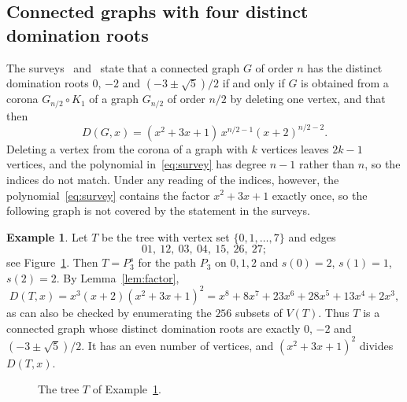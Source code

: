 \documentclass{amsart}
\theoremstyle{definition}
\newtheorem{example}[theorem]{Example}
\theoremstyle{remark}
\numberwithin{equation}{section}
\begin{document}
\subsection{Connected graphs with four distinct domination roots}

The surveys~\cite[Theorem~10]{Ali11s} and~\cite[Theorem~12, Eq.~(4)]{Ali13} state that a connected graph $G$ of order $n$ has the distinct domination roots $0$, $-2$ and $(-3\pm\sqrt5)/2$ if and only if $G$ is obtained from a corona $G_{n/2}\circ K_1$ of a graph $G_{n/2}$ of order $n/2$ by deleting one vertex, and that then
\begin{equation}\label{eq:survey}
D(G,x)=(x^2+3x+1)\,x^{n/2-1}(x+2)^{n/2-2}.
\end{equation}
Deleting a vertex from the corona of a graph with $k$ vertices leaves $2k-1$ vertices, and the polynomial in~\eqref{eq:survey} has degree $n-1$ rather than $n$, so the indices do not match. Under any reading of the indices, however, the polynomial~\eqref{eq:survey} contains the factor $x^2+3x+1$ exactly once, so the following graph is not covered by the statement in the surveys.

\begin{example}\label{ex:tree}
Let $T$ be the tree with vertex set $\{0,1,\dots,7\}$ and edges
\[
01,\ 12,\ 03,\ 04,\ 15,\ 26,\ 27;
\]
see Figure~\ref{fig:tree}. Then $T=P_3^s$ for the path $P_3$ on $0,1,2$ and $s(0)=2$, $s(1)=1$, $s(2)=2$. By Lemma~\ref{lem:factor},
\[
D(T,x)=x^3(x+2)(x^2+3x+1)^2=x^8+8x^7+23x^6+28x^5+13x^4+2x^3,
\]
as can also be checked by enumerating the $256$ subsets of $V(T)$. Thus $T$ is a connected graph whose distinct domination roots are exactly $0$, $-2$ and $(-3\pm\sqrt5)/2$. It has an even number of vertices, and $(x^2+3x+1)^2$ divides $D(T,x)$.
\end{example}

\begin{figure}[ht]
\centering
{}
\caption{The tree $T$ of Example~\ref{ex:tree}.}
\label{fig:tree}
\end{figure}
\end{document}
